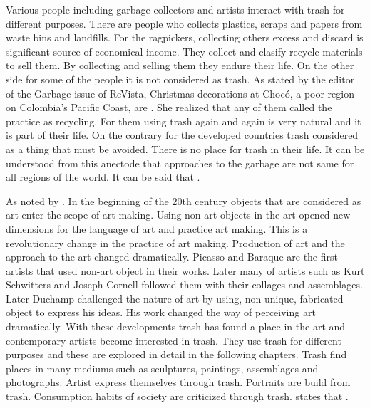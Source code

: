 Various people including garbage collectors and artists interact with trash for different purposes. There are people who collects plastics, scraps and papers from waste bins and landfills. For the ragpickers, collecting others excess and discard is significant source of economical income. They collect and clasify recycle materials to sell them. By collecting and selling them they endure their life. On the other side for some of the people it is not considered as trash. As stated by the editor of the Garbage issue of ReVista, Christmas decorations at Chocó, a poor region on Colombia’s Pacific Coast, are  \citep{erlick2015editorsletter}. She realized that any of them called the practice as recycling. For them using trash again and again is very natural and it is part of their life. On the contrary for the developed countries trash considered as a thing that must be avoided. There is no place for trash in their life. It can be understood from this anectode that approaches to the garbage are not same for all regions of the world. It can be said that  \citep[xxvi]{zimring2012encyclopedia}.

As noted by \cite{pye2010trashculture} . In the beginning of the 20th century objects that are considered as art enter the scope of art making. Using non-art objects in the art opened new dimensions for the language of art and practice art making. This is a revolutionary change in the practice of art making. Production of art and the approach to the art changed dramatically. Picasso and Baraque are the first artists that used non-art object in their works. Later many of artists such as Kurt Schwitters and Joseph Cornell followed them with their collages and assemblages. Later Duchamp challenged the nature of art by using, non-unique, fabricated object to express his ideas. His work changed the way of perceiving art dramatically. With these developments trash has found a place in the art and contemporary artists become interested in trash. They use trash for different purposes and these are explored in detail in the following chapters. Trash find places in many mediums such as sculptures, paintings, assemblages and photographs. Artist express themselves through trash. Portraits are build from trash. Consumption habits of society are criticized through trash. \cite[2]{pye2010trashculture} states that .



